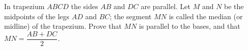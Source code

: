 In trapezium $ABCD$ the sides $AB$ and $DC$ are parallel. Let $M$ and $N$ be the midpoints of the legs $AD$ and $BC$; the segment $MN$ is called the median (or midline) of the trapezium. Prove that $MN$ is parallel to the bases, and that $MN=\dfrac{AB+DC}{2}$.
